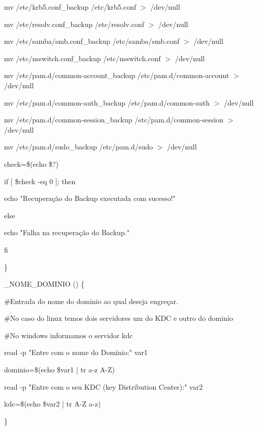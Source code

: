         mv /etc/krb5.conf\_backup /etc/krb5.conf $>$ /dev/null

        mv /etc/resolv.conf\_backup /etc/resolv.conf $>$ /dev/null

        mv /etc/samba/smb.conf\_backup /etc/samba/smb.conf $>$ /dev/null

        mv /etc/nsswitch.conf\_backup /etc/nsswitch.conf $>$ /dev/null

        mv /etc/pam.d/common-account\_backup /etc/pam.d/common-account $>$ /dev/null

        mv /etc/pam.d/common-auth\_backup /etc/pam.d/common-auth $>$ /dev/null
        
        mv /etc/pam.d/common-session\_backup /etc/pam.d/common-session $>$ /dev/null

        mv /etc/pam.d/sudo\_backup /etc/pam.d/sudo $>$ /dev/null
         
        
				check=\$(echo \$?)

   if [ \$check -eq 0 ]; then

      echo "Recuperação do Backup executada com sucesso!"

   else

      echo "Falha na recuperação do Backup."

   fi
         
\}

\_NOME\_DOMINIO () \{
 
   \#Entrada do nome do dominio ao qual deseja engreçar.

	 \#No caso do linux temos dois servidores um do KDC e outro do dominio

	 \#No windows informamos o servidor kdc

    read -p "Entre com o nome do Domínio:" var1

    dominio=\$(echo \$var1 | tr a-z A-Z)

    read -p "Entre com o seu KDC (key Distribution Center):" var2

    kdc=\$(echo \$var2 | tr A-Z a-z)         

\}

